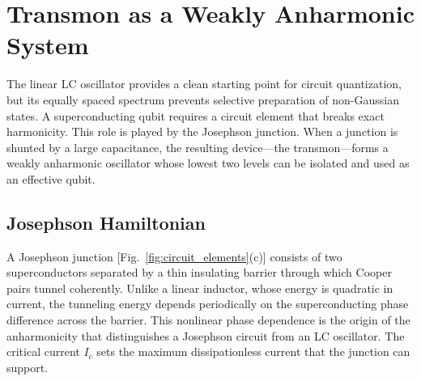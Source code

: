 \section{Transmon as a Weakly Anharmonic System}
\label{sec:transmon}

The linear LC oscillator provides a clean starting point for circuit quantization, but its equally spaced spectrum prevents selective preparation of non-Gaussian states. A superconducting qubit requires a circuit element that breaks exact harmonicity. This role is played by the Josephson junction. When a junction is shunted by a large capacitance, the resulting device---the transmon---forms a weakly anharmonic oscillator whose lowest two levels can be isolated and used as an effective qubit.
\subsection{Josephson Hamiltonian}

A Josephson junction [Fig.~\ref{fig:circuit_elements}(c)] consists of two superconductors separated by a thin insulating barrier through which Cooper pairs tunnel coherently. Unlike a linear inductor, whose energy is quadratic in current, the tunneling energy depends periodically on the superconducting phase difference across the barrier. This nonlinear phase dependence is the origin of the anharmonicity that distinguishes a Josephson circuit from an LC oscillator. The critical current $I_c$ sets the maximum dissipationless current that the junction can support.

